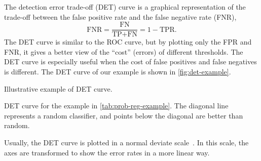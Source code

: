 The detection error trade-off (DET) curve is a graphical representation of the trade-off
between the false positive rate and the false negative rate (FNR),
\begin{equation*}
  \text{FNR} = \frac{\text{FN}}{\text{TP} + \text{FN}} = 1 - \text{TPR}\text{.}
\end{equation*}
The DET curve is similar to the ROC curve, but by plotting only the FPR and FNR, it gives
a better view of the ``cost'' (errors) of different thresholds.  The DET curve is
especially useful when the cost of false positives and false negatives is different.
The DET curve of our example is shown in \cref{fig:det-example}.

\begin{figurebox}[label=fig:det-example]{Illustrative example of DET curve.}
  \centering
  \tcblower
  DET curve for the example in \cref{tab:prob-reg-example}.  The diagonal line represents
  a random classifier, and points below the diagonal are better than random.
\end{figurebox}

Usually, the DET curve is plotted in a normal deviate scale~\parencite{Martin1997}.  In
this scale, the axes are transformed to show the error rates in a more linear way.

